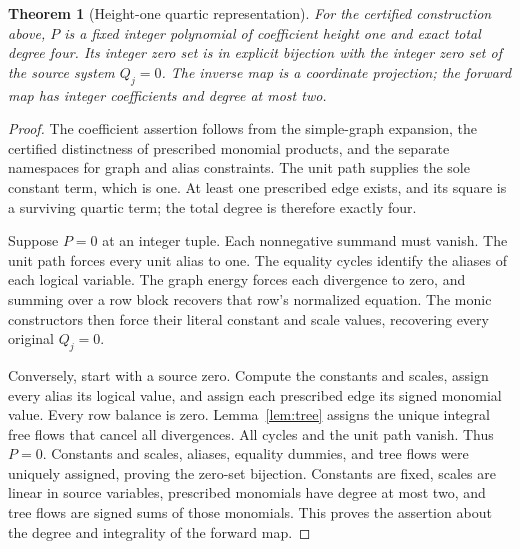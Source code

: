 \documentclass[11pt]{article}
\newtheorem{theorem}{Theorem}[section]
\theoremstyle{definition}\newtheorem{definition}[theorem]{Definition}
\theoremstyle{remark}\newtheorem{remark}[theorem]{Remark}
\begin{document}
\begin{theorem}[Height-one quartic representation]\label{thm:compiler}
For the certified construction above, $P$ is a fixed integer polynomial of
coefficient height one and exact total degree four. Its integer zero set is in
explicit bijection with the integer zero set of the source system $Q_j=0$.
The inverse map is a coordinate projection; the forward map has integer
coefficients and degree at most two.
\end{theorem}
\begin{proof}
The coefficient assertion follows from the simple-graph expansion, the
certified distinctness of prescribed monomial products, and the separate
namespaces for graph and alias constraints. The unit path supplies the sole
constant term, which is one. At least one prescribed edge exists, and its
square is a surviving quartic term; the total degree is therefore exactly four.

Suppose $P=0$ at an integer tuple. Each nonnegative summand must vanish.
The unit path forces every unit alias to one. The equality cycles identify the
aliases of each logical variable. The graph energy forces each divergence to
zero, and summing over a row block recovers that row's normalized equation.
The monic constructors then force their literal constant and scale values,
recovering every original $Q_j=0$.

Conversely, start with a source zero. Compute the constants and scales, assign
every alias its logical value, and assign each prescribed edge its signed
monomial value. Every row balance is zero. Lemma~\ref{lem:tree} assigns the
unique integral free flows that cancel all divergences. All cycles and the unit
path vanish. Thus $P=0$. Constants and scales, aliases, equality dummies, and
tree flows were uniquely assigned, proving the zero-set bijection. Constants
are fixed, scales are linear in source variables, prescribed monomials have
degree at most two, and tree flows are signed sums of those monomials. This
proves the assertion about the degree and integrality of the forward map.
\end{proof}
\end{document}
